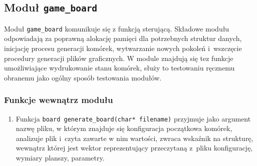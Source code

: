 \documentclass[a4paper,11pt]{article}
\begin{document}
		  \subsection{Moduł \texttt{game\_board}}
			Moduł \texttt{game\_board} komunikuje się z funkcją sterującą. Składowe modułu odpowiadają za poprawną alokację pamięci dla potrzebnych struktur danych, inicjację procesu generacji komórek, wytwarzanie nowych pokoleń i~wszczęcie procedury generacji plików graficznych. W module znajdują się tez funkcje umożliwiające wydrukowanie stanu komórek, służy to testowaniu ręcznemu obranemu jako ogólny sposób testowania modułów.
			\subsubsection{Funkcje wewnątrz modułu}
				\begin{enumerate}
					\item Funkcja \texttt{board generate\_board(char* filename)} przyjmuje jako argument nazwę pliku, w którym znajduje się konfiguracja początkowa komórek, analizuje plik i~czyta zawarte w nim wartości, zwraca wskaźnik na strukturę, wewnątrz której jest wektor reprezentujący przeczytaną z~pliku konfigurację, wymiary planszy, parametry.
					

\end{enumerate}
\end{document}
